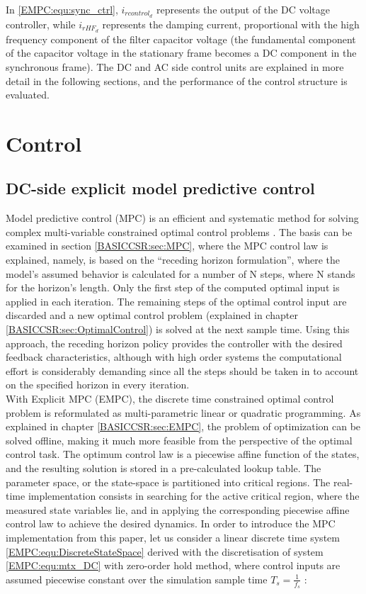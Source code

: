     In \ref{EMPC:equ:sync_ctrl}, $i_{rcontrol_d}$ represents the output of the DC voltage controller, while $i_{rHF_d}$ represents the damping current, proportional with the high frequency component of the filter capacitor voltage (the fundamental component of the capacitor voltage in the stationary frame becomes a DC component in the synchronous frame). The DC and AC side control units are explained in more detail in the following sections, and the performance of the control structure is evaluated.
		
\section{Control}\label{EMPC:sec:Control}


\subsection{DC-side explicit model predictive control} \label{EMPC:sec:DCside}

    Model predictive control (MPC) is an efficient and systematic method for solving complex multi-variable constrained optimal control problems \cite{vajda2017limiting}. The basis can be examined in section \ref{BASICCSR:sec:MPC}, where the MPC control law is explained, namely, is based on the “receding horizon formulation”, where the model’s assumed behavior is calculated for a number of N steps, where N stands for the horizon’s length. Only the first step of the computed optimal input is applied in each iteration. The remaining steps of the optimal control input are discarded and a new optimal control problem (explained in chapter \ref{BASICCSR:sec:OptimalControl}) is solved at the next sample time. Using this approach, the receding horizon policy provides the controller with the desired feedback characteristics, although with high order systems the computational effort is considerably demanding since all the steps should be taken in to account on the specified horizon in every iteration.\\
		With Explicit MPC (EMPC), the discrete time constrained optimal control problem is reformulated as multi-parametric linear or quadratic programming. As explained in chapter \ref{BASICCSR:sec:EMPC}, the problem of optimization can be solved offline, making it much more feasible from the perspective of the optimal control task. The optimum control law is a piecewise affine function of the states, and the resulting solution is stored in a pre-calculated lookup table. The parameter space, or the state-space is partitioned into critical regions. The real-time implementation consists in searching for the active critical region, where the measured state variables lie, and in applying the corresponding piecewise affine control law to achieve the desired dynamics.
    In order to introduce the MPC implementation from this paper, let us consider a linear discrete time system \ref{EMPC:equ:DiscreteStateSpace} derived with the discretisation of system \ref{EMPC:equ:mtx_DC} with zero-order hold method, where control inputs are assumed piecewise constant over the simulation sample time $T_s=\frac{1}{f_s}$ :

